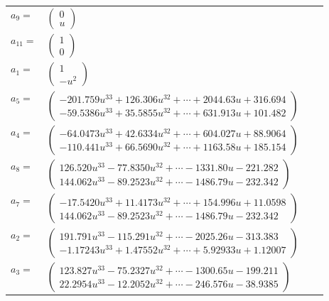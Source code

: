 \documentclass[1p]{elsarticle_modified}
\theoremstyle{definition}
\begin{document}
\begin{tabular}{m{7pt} m{180pt} m{7pt} m{180pt} }
\flushright $a_{9}=$&$\begin{pmatrix}0\\u\end{pmatrix}$ \\
\flushright $a_{11}=$&$\begin{pmatrix}1\\0\end{pmatrix}$ \\
\flushright $a_{1}=$&$\begin{pmatrix}1\\- u^2\end{pmatrix}$ \\
\flushright $a_{5}=$&$\begin{pmatrix}-201.759 u^{33}+126.306 u^{32}+\cdots+2044.63 u+316.694\\-59.5386 u^{33}+35.5855 u^{32}+\cdots+631.913 u+101.482\end{pmatrix}$ \\
\flushright $a_{4}=$&$\begin{pmatrix}-64.0473 u^{33}+42.6334 u^{32}+\cdots+604.027 u+88.9064\\-110.441 u^{33}+66.5690 u^{32}+\cdots+1163.58 u+185.154\end{pmatrix}$ \\
\flushright $a_{8}=$&$\begin{pmatrix}126.520 u^{33}-77.8350 u^{32}+\cdots-1331.80 u-221.282\\144.062 u^{33}-89.2523 u^{32}+\cdots-1486.79 u-232.342\end{pmatrix}$ \\
\flushright $a_{7}=$&$\begin{pmatrix}-17.5420 u^{33}+11.4173 u^{32}+\cdots+154.996 u+11.0598\\144.062 u^{33}-89.2523 u^{32}+\cdots-1486.79 u-232.342\end{pmatrix}$ \\
\flushright $a_{2}=$&$\begin{pmatrix}191.791 u^{33}-115.291 u^{32}+\cdots-2025.26 u-313.383\\-1.17243 u^{33}+1.47552 u^{32}+\cdots+5.92933 u+1.12007\end{pmatrix}$ \\
\flushright $a_{3}=$&$\begin{pmatrix}123.827 u^{33}-75.2327 u^{32}+\cdots-1300.65 u-199.211\\22.2954 u^{33}-12.2052 u^{32}+\cdots-246.576 u-38.9385\end{pmatrix}$ \\

\end{tabular}
\end{document}
